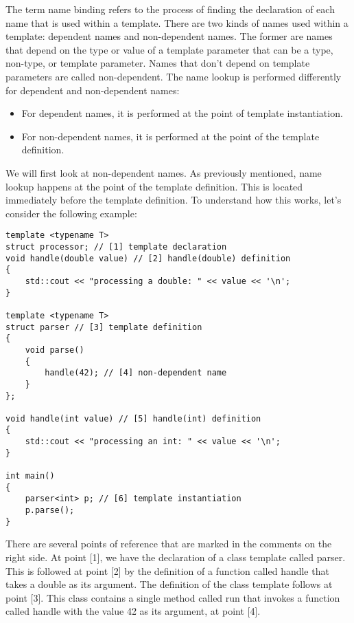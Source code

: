 
The term name binding refers to the process of finding the declaration of each name that is used within a template. There are two kinds of names used within a template: dependent names and non-dependent names. The former are names that depend on the type or value of a template parameter that can be a type, non-type, or template parameter. Names that don’t depend on template parameters are called non-dependent. The name lookup is performed differently for dependent and non-dependent names:

\begin{itemize}
\item
For dependent names, it is performed at the point of template instantiation.

\item
For non-dependent names, it is performed at the point of the template definition.
\end{itemize}

We will first look at non-dependent names. As previously mentioned, name lookup happens at the point of the template definition. This is located immediately before the template definition. To understand how this works, let’s consider the following example:

\begin{lstlisting}[style=styleCXX]
template <typename T>
struct processor; // [1] template declaration
void handle(double value) // [2] handle(double) definition
{
	std::cout << "processing a double: " << value << '\n';
}

template <typename T>
struct parser // [3] template definition
{
	void parse()
	{
		handle(42); // [4] non-dependent name
	}
};

void handle(int value) // [5] handle(int) definition
{
	std::cout << "processing an int: " << value << '\n';
}

int main()
{
	parser<int> p; // [6] template instantiation
	p.parse();
}
\end{lstlisting}

There are several points of reference that are marked in the comments on the right side. At point [1], we have the declaration of a class template called parser. This is followed at point [2] by the definition of a function called handle that takes a double as its argument. The definition of the class template follows at point [3]. This class contains a single method called run that invokes a function called handle with the value 42 as its argument, at point [4].

